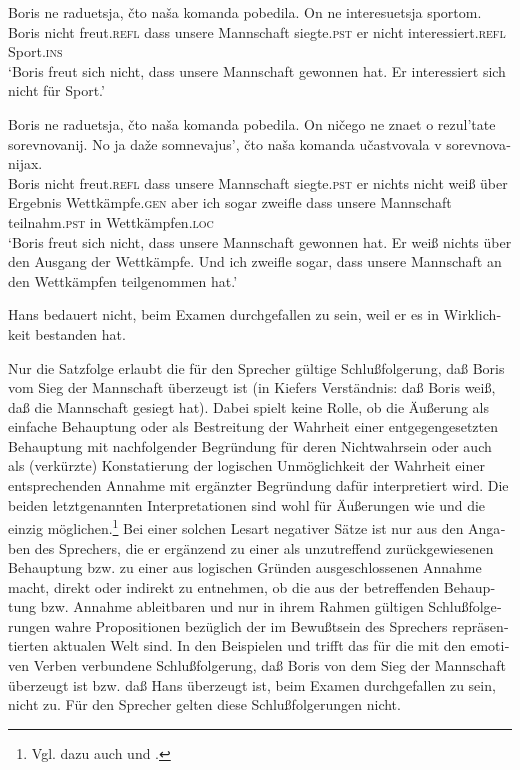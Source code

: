 \documentclass[output=paper]{langscibook}
\begin{document}
\begin{otherlanguage}{german}
\ea \label{ex:zi83:48}
    \gll Boris ne raduetsja, čto naša komanda pobedila. On ne interesuetsja sportom. \\
    Boris nicht freut.\textsc{refl} dass unsere Mannschaft siegte.\textsc{pst} er nicht interessiert.\textsc{refl} Sport.\textsc{ins} \\
    \glt ‘Boris freut sich nicht, dass unsere Mannschaft gewonnen hat. Er interessiert sich nicht für Sport.’
    
    
\ex \label{ex:zi83:49}
    \gll Boris ne raduetsja, čto naša komanda pobedila. On ničego ne znaet o rezul'tate sorevnovanij. No ja daže somnevajus’, čto naša komanda učastvovala v sorevnovanijax.\\
    Boris nicht freut.\textsc{refl} dass unsere Mannschaft siegte.\textsc{pst} er nichts nicht weiß über Ergebnis Wettkämpfe.\textsc{gen} aber ich sogar zweifle dass unsere Mannschaft teilnahm.\textsc{pst} in  Wettkämpfen.\textsc{loc} \\
    \glt ‘Boris freut sich nicht, dass unsere Mannschaft gewonnen hat. Er weiß nichts über den Ausgang der Wettkämpfe. Und ich zweifle sogar, dass unsere Mannschaft an den Wettkämpfen teilgenommen hat.’
    
\ex \label{ex:zi83:50} Hans bedauert nicht, beim Examen durchgefallen zu sein, weil er es in Wirklichkeit bestanden hat.

\z

\noindent Nur die Satzfolge  erlaubt die für den Sprecher gültige Schlußfolgerung, daß Boris vom Sieg der Mannschaft überzeugt ist (in Kiefers %
Verständnis: daß Boris weiß, daß die Mannschaft gesiegt hat). Dabei spielt keine Rolle, ob die Äußerung als einfache Behauptung oder als Bestreitung der Wahrheit einer entgegengesetzten Behauptung mit nachfolgender Begründung für deren Nichtwahrsein oder auch als (verkürzte) Konstatierung der logischen Unmöglichkeit der Wahrheit einer entsprechenden Annahme mit ergänzter Begründung dafür interpretiert wird. Die beiden letztgenannten Interpretationen sind wohl für Äußerungen wie  und  die einzig möglichen.\footnote{Vgl. dazu auch \citet[414]{zuber1977decomposition-of-factives} und \citet[183 ff.]{kiefer1978factivity-in-hungarian}.} Bei einer solchen Lesart negativer Sätze ist nur aus den Angaben des Sprechers, die er ergänzend zu einer als unzutreffend zurückgewiesenen Behauptung bzw. zu einer aus logischen Gründen ausgeschlossenen Annahme macht, direkt oder indirekt zu entnehmen, ob die aus der betreffenden Behauptung bzw. Annahme ableitbaren und nur in ihrem Rahmen gültigen Schlußfolgerungen wahre Propositionen bezüglich der im Bewußtsein des Sprechers repräsentierten aktualen Welt sind. In den Beispielen  und  trifft das für die mit den emotiven Verben verbundene Schlußfolgerung, daß Boris von dem Sieg der Mannschaft überzeugt ist bzw. daß Hans überzeugt ist, beim Examen durchgefallen zu sein, nicht zu. Für den Sprecher gelten diese Schlußfolgerungen nicht.


\end{otherlanguage}
\end{document}
